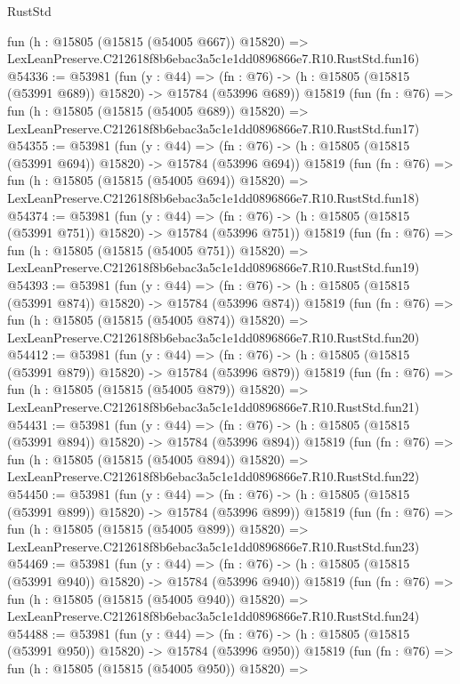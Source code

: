 \begin{lexlean}{RustStd}
\begin{coremodule}
    fun (h : @15805 (@15815 (@54005 @667)) @15820) =>
    LexLeanPreserve.C212618f8b6ebac3a5c1e1dd0896866e7.R10.RustStd.fun16)
@54336 := @53981
    (fun (y : @44) =>
    (fn : @76) -> (h : @15805 (@15815 (@53991 @689)) @15820) -> @15784 (@53996 @689))
    @15819
    (fun (fn : @76) =>
    fun (h : @15805 (@15815 (@54005 @689)) @15820) =>
    LexLeanPreserve.C212618f8b6ebac3a5c1e1dd0896866e7.R10.RustStd.fun17)
@54355 := @53981
    (fun (y : @44) =>
    (fn : @76) -> (h : @15805 (@15815 (@53991 @694)) @15820) -> @15784 (@53996 @694))
    @15819
    (fun (fn : @76) =>
    fun (h : @15805 (@15815 (@54005 @694)) @15820) =>
    LexLeanPreserve.C212618f8b6ebac3a5c1e1dd0896866e7.R10.RustStd.fun18)
@54374 := @53981
    (fun (y : @44) =>
    (fn : @76) -> (h : @15805 (@15815 (@53991 @751)) @15820) -> @15784 (@53996 @751))
    @15819
    (fun (fn : @76) =>
    fun (h : @15805 (@15815 (@54005 @751)) @15820) =>
    LexLeanPreserve.C212618f8b6ebac3a5c1e1dd0896866e7.R10.RustStd.fun19)
@54393 := @53981
    (fun (y : @44) =>
    (fn : @76) -> (h : @15805 (@15815 (@53991 @874)) @15820) -> @15784 (@53996 @874))
    @15819
    (fun (fn : @76) =>
    fun (h : @15805 (@15815 (@54005 @874)) @15820) =>
    LexLeanPreserve.C212618f8b6ebac3a5c1e1dd0896866e7.R10.RustStd.fun20)
@54412 := @53981
    (fun (y : @44) =>
    (fn : @76) -> (h : @15805 (@15815 (@53991 @879)) @15820) -> @15784 (@53996 @879))
    @15819
    (fun (fn : @76) =>
    fun (h : @15805 (@15815 (@54005 @879)) @15820) =>
    LexLeanPreserve.C212618f8b6ebac3a5c1e1dd0896866e7.R10.RustStd.fun21)
@54431 := @53981
    (fun (y : @44) =>
    (fn : @76) -> (h : @15805 (@15815 (@53991 @894)) @15820) -> @15784 (@53996 @894))
    @15819
    (fun (fn : @76) =>
    fun (h : @15805 (@15815 (@54005 @894)) @15820) =>
    LexLeanPreserve.C212618f8b6ebac3a5c1e1dd0896866e7.R10.RustStd.fun22)
@54450 := @53981
    (fun (y : @44) =>
    (fn : @76) -> (h : @15805 (@15815 (@53991 @899)) @15820) -> @15784 (@53996 @899))
    @15819
    (fun (fn : @76) =>
    fun (h : @15805 (@15815 (@54005 @899)) @15820) =>
    LexLeanPreserve.C212618f8b6ebac3a5c1e1dd0896866e7.R10.RustStd.fun23)
@54469 := @53981
    (fun (y : @44) =>
    (fn : @76) -> (h : @15805 (@15815 (@53991 @940)) @15820) -> @15784 (@53996 @940))
    @15819
    (fun (fn : @76) =>
    fun (h : @15805 (@15815 (@54005 @940)) @15820) =>
    LexLeanPreserve.C212618f8b6ebac3a5c1e1dd0896866e7.R10.RustStd.fun24)
@54488 := @53981
    (fun (y : @44) =>
    (fn : @76) -> (h : @15805 (@15815 (@53991 @950)) @15820) -> @15784 (@53996 @950))
    @15819
    (fun (fn : @76) =>
    fun (h : @15805 (@15815 (@54005 @950)) @15820) =>

\end{coremodule}
\end{lexlean}
